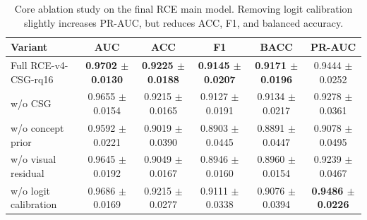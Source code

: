 \begin{table}[t]
\centering
\caption{Core ablation study on the final RCE main model. Removing logit calibration slightly increases PR-AUC, but reduces ACC, F1, and balanced accuracy.}
\label{tab:stage52b-rce-ablation}
\begin{tabular}{lccccc}
\hline
Variant & AUC & ACC & F1 & BACC & PR-AUC \\
\hline
Full RCE-v4-CSG-rq16 & \textbf{0.9702 $\pm$ 0.0130} & \textbf{0.9225 $\pm$ 0.0188} & \textbf{0.9145 $\pm$ 0.0207} & \textbf{0.9171 $\pm$ 0.0196} & 0.9444 $\pm$ 0.0252 \\
w/o CSG & 0.9655 $\pm$ 0.0154 & 0.9215 $\pm$ 0.0165 & 0.9127 $\pm$ 0.0191 & 0.9134 $\pm$ 0.0217 & 0.9278 $\pm$ 0.0361 \\
w/o concept prior & 0.9592 $\pm$ 0.0221 & 0.9019 $\pm$ 0.0390 & 0.8903 $\pm$ 0.0445 & 0.8891 $\pm$ 0.0447 & 0.9078 $\pm$ 0.0495 \\
w/o visual residual & 0.9645 $\pm$ 0.0192 & 0.9049 $\pm$ 0.0167 & 0.8946 $\pm$ 0.0160 & 0.8960 $\pm$ 0.0154 & 0.9239 $\pm$ 0.0467 \\
w/o logit calibration & 0.9686 $\pm$ 0.0169 & 0.9215 $\pm$ 0.0277 & 0.9111 $\pm$ 0.0338 & 0.9076 $\pm$ 0.0394 & \textbf{0.9486 $\pm$ 0.0226} \\
\hline
\end{tabular}
\end{table}


